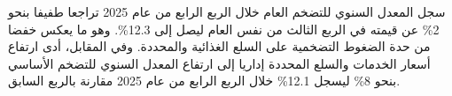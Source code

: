 سجل المعدل السنوي للتضخم العام خلال الربع الرابع من عام 2025 تراجعا طفيفا بنحو 2\% عن قيمته في الربع الثالث من نفس العام ليصل إلى 12.3\%. وهو ما يعكس خفضا من حدة الضغوط التضخمية على السلع الغذائية والمحددة. وفي المقابل، أدى ارتفاع أسعار الخدمات والسلع المحددة إداريا إلى ارتفاع المعدل السنوي للتضخم الأساسي بنحو 8\% ليسجل 12.1\% خلال الربع الرابع من عام 2025 مقارنة بالربع السابق.
